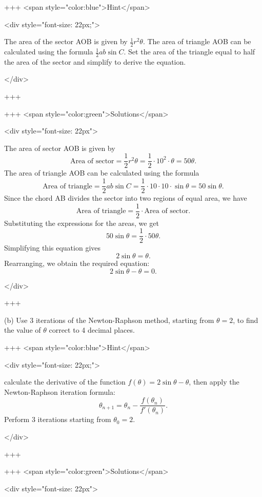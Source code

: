 +++ <span style="color:blue">Hint</span>

<div style="font-size: 22px;">

The area of the sector AOB is given by $\frac{1}{2} r^2 \theta$. The area of triangle AOB can be calculated using the formula $\frac{1}{2} ab \sin C$. Set the area of the triangle equal to half the area of the sector and simplify to derive the equation.

</div>

+++

+++ <span style="color:green">Solutions</span>

<div style="font-size: 22px">

The area of sector AOB is given by 
$$\text{Area of sector} = \frac{1}{2} r^2 \theta = \frac{1}{2} \cdot 10^2 \cdot \theta = 50\theta.$$
The area of triangle AOB can be calculated using the formula
$$\text{Area of triangle} = \frac{1}{2} ab \sin C = \frac{1}{2} \cdot 10 \cdot 10 \cdot \sin \theta = 50 \sin \theta.$$
Since the chord AB divides the sector into two regions of equal area, we have
$$\text{Area of triangle} = \frac{1}{2} \cdot \text{Area of sector}.$$
Substituting the expressions for the areas, we get
$$50 \sin \theta = \frac{1}{2} \cdot 50 \theta.$$
Simplifying this equation gives
$$2 \sin \theta = \theta.$$
Rearranging, we obtain the required equation:
$$2 \sin \theta - \theta = 0.$$


</div>

+++


(b) Use 3 iterations of the Newton-Raphson method, starting from $\theta=2$, to find the value of $\theta$ correct to 4 decimal places.

+++ <span style="color:blue">Hint</span>

<div style="font-size: 22px;">

calculate the derivative of the function $f(\theta) = 2 \sin \theta - \theta$, then apply the Newton-Raphson iteration formula:
$$\theta_{n+1} = \theta_n - \frac{f(\theta_n)}{f'(\theta_n)}.$$
Perform 3 iterations starting from $\theta_0 = 2$.

</div>

+++

+++ <span style="color:green">Solutions</span>

<div style="font-size: 22px">

